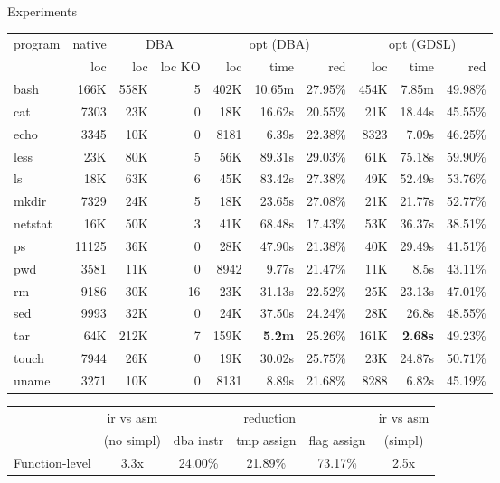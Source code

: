 \begin{frame}{Experiments}
    \tiny
    \begin{center}
    \begin{tabular}{|l|r|rr|rrr||rrr|}
    \hline 
    program & native & \multicolumn{2}{c|}{DBA} & \multicolumn{3}{c|}{opt (DBA)} & \multicolumn{3}{|c|}{opt (GDSL)}\\
                & loc  &  loc  & loc KO   & loc & time & red   & loc & time & red                     \\
    \hline
    bash &166K & 558K & 5 & 402K & 10.65m & 27.95\% & 454K & 7.85m & 49.98\%\\
    cat & 7303 & 23K & 0 & 18K & 16.62s & 20.55\% & 21K & 18.44s & 45.55\%\\
    echo & 3345 & 10K & 0 & 8181 & 6.39s & 22.38\% & 8323 & 7.09s & 46.25\%\\
    less & 23K & 80K & 5 & 56K & 89.31s & 29.03\% & 61K & 75.18s & 59.90\%\\
    ls & 18K & 63K & 6 & 45K & 83.42s  & 27.38\% & 49K & 52.49s & 53.76\%\\
    mkdir & 7329 & 24K & 5 & 18K & 23.65s & 27.08\% & 21K & 21.77s & 52.77\%\\
    netstat & 16K & 50K & 3 & 41K & 68.48s  & 17.43\% & 53K & 36.37s & 38.51\%\\
    ps & 11125 & 36K & 0 & 28K & 47.90s & 21.38\% & 40K & 29.49s & 41.51\%\\
    pwd & 3581 & 11K & 0 & 8942 & 9.77s & 21.47\% & 11K & 8.5s & 43.11\%\\
    rm & 9186 & 30K & 16 & 23K & 31.13s & 22.52\% & 25K & 23.13s & 47.01\%\\
    sed & 9993 & 32K & 0 & 24K & 37.50s & 24.24\% & 28K & 26.8s & 48.55\%\\
    tar & 64K & 212K & 7 & 159K & {\bf 5.2m} & 25.26\% & 161K & {\bf 2.68s} & 49.23\%\\
    touch & 7944 & 26K & 0 & 19K & 30.02s & 25.75\% & 23K & 24.87s & 50.71\%\\
    uname & 3271 & 10K & 0 & 8131 & 8.89s & 21.68\% & 8288 & 6.82s & 45.19\%\\
    \hline
    \end{tabular}
    \end{center}
     \tiny
     \begin{center}
     \begin{tabular}{   |l|c||c|c|c||c|  }

     \hline
         &  ir vs asm            & \multicolumn{3}{c|}{reduction}  & ir vs asm  \\
     \cline{3-5}
                &  (no simpl)       & dba instr & tmp assign  & flag assign  & (simpl) \\
     \hline
     Function-level & 3.3x  &  24.00\% & 21.89\% & 73.17\%  & 2.5x \\


\end{tabular}
\end{center}
\end{frame}
